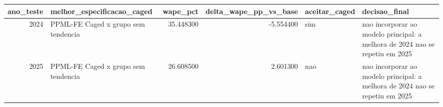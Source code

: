 \begin{tabular}{rlrrll}
\toprule
ano_teste & melhor_especificacao_caged & wape_pct & delta_wape_pp_vs_base & aceitar_caged & decisao_final \\
\midrule
2024 & PPML-FE Caged x grupo sem tendencia & 35.448300 & -5.554400 & sim & nao incorporar ao modelo principal: a melhora de 2024 nao se repetiu em 2025 \\
2025 & PPML-FE Caged x grupo sem tendencia & 26.608500 & 2.601300 & nao & nao incorporar ao modelo principal: a melhora de 2024 nao se repetiu em 2025 \\
\bottomrule
\end{tabular}
